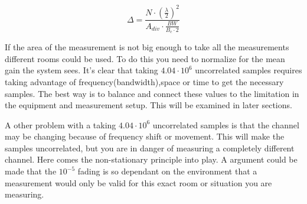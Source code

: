 \begin{equation}
\Delta  = \frac{N\cdot (\frac{\lambda}{2})^2}{A_{div}\cdot \frac{BW}{B_c \cdot 2}}
\label{howtosqaure}
\end{equation}

If the area of the measurement is not big enough to take all the measurements different rooms could be used. To do this you need to normalize for the mean gain the system sees. It's clear that taking $4.04\cdot10^6$  uncorrelated samples requires taking advantage of  frequency(bandwidth),space or time to get the necessary samples. The best way is to balance and connect these values to the limitation in the equipment and measurement setup. This will be examined in later sections. 

A other problem with a taking $4.04\cdot10^6$  uncorrelated samples is that the channel may be changing because of frequency shift or movement. This will make the samples uncorrelated, but you are in danger of measuring a completely different channel. Here comes the non-stationary principle into play. A argument could be made that the $10^{-5}$ fading is so dependant on the environment that a measurement would only be valid for this exact room or situation you are measuring.


